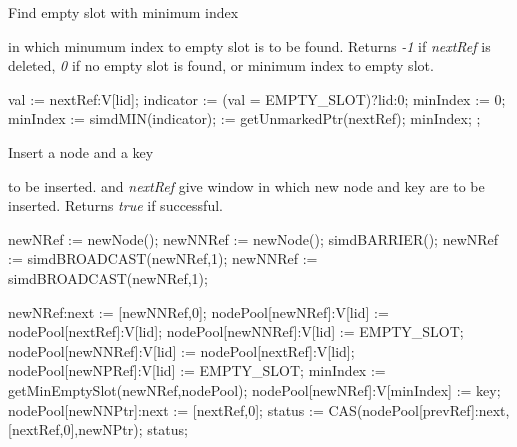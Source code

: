 \documentclass[11pt,onecolumn]{IEEEtran}
\begin{document}
\begin{algorithm}
  \caption{Find empty slot with minimum index}
  \label{alg:minindex}
  \begin{algorithmic}[1]
    \Require
       in which minumum index to empty slot is to be
              found.
    \Ensure
      \Statex Returns {\it -1} if {\it nextRef} is deleted, {\it 0} if no
              empty slot is found, or minimum index to empty slot.  
    
      \State val := nextRef:V[lid];
      \State indicator := (val = EMPTY\_SLOT)?lid:0;
        \State minIndex := 0;
      \Else
        \State minIndex := simdMIN(indicator);
      \EndIf
       := getUnmarkedPtr(nextRef);
        \State
        \Return minIndex;
      \Else
        \State
        ;
      \EndIf  
    \EndFunction
  \end{algorithmic}
\end{algorithm}

\begin{algorithm}
  \caption{Insert a node and a key}
  \label{alg:insnodekey}
  \begin{algorithmic}[1]
    \Require
       to be inserted.
       and {\it nextRef} give window in which new node
              and key are to be inserted.
    \Ensure
       \Statex Returns {\it true} if successful.
    
        \State newNRef := newNode();
        \State newNNRef := newNode();
      \EndIf
      \State simdBARRIER();
      \State newNRef  := simdBROADCAST(newNRef,1);
      \State newNNRef := simdBROADCAST(newNRef,1);      
      
      \State newNRef:next := [newNNRef,0];
        \State nodePool[newNRef]:V[lid] := nodePool[nextRef]:V[lid];
        \State nodePool[newNNRef]:V[lid] := EMPTY\_SLOT;
      \Else
        \State nodePool[newNNRef]:V[lid] := nodePool[nextRef]:V[lid];
        \State nodePool[newNPRef]:V[lid] := EMPTY\_SLOT;
      \EndIf
      \State minIndex := getMinEmptySlot(newNRef,nodePool);
      \State nodePool[newNRef]:V[minIndex] := key;
      \State nodePool[newNNPtr]:next := [nextRef,0];
      \State status := CAS(nodePool[prevRef]:next,[nextRef,0],newNPtr);
      \Return status;
    \EndFunction
  \end{algorithmic}
\end{algorithm}
\end{document}
